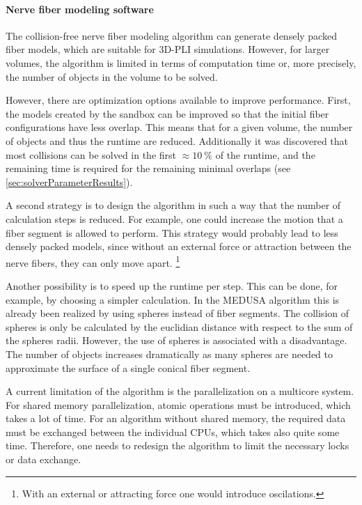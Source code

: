 \paragraph{Nerve fiber modeling software}
% 
The collision-free nerve fiber modeling algorithm can generate densely packed fiber models, which are suitable for \ac{3D-PLI} simulations.
However, for larger volumes, the algorithm is limited in terms of computation time or, more precisely, the number of objects in the volume to be solved.
\par
% 
However, there are optimization options available to improve performance.
First, the models created by the sandbox can be improved so that the initial fiber configurations have less overlap. 
This means that for a given volume, the number of objects and thus the runtime are reduced. 
Additionally it was discovered that most collisions can be solved in the first $\approx \SI{10}{\percent}$ of the runtime, and the remaining time is required for the remaining minimal overlaps (see \cref{sec:solverParameterResults}).
\par
% 
A second strategy is to design the algorithm in such a way that the number of calculation steps is reduced.
For example, one could increase the motion that a fiber segment is allowed to perform.
This strategy would probably lead to less densely packed models, since without an external force or attraction between the nerve fibers, they can only move apart. \footnote{With an external or attracting force one would introduce oscilations.}
% 
\par
Another possibility is to speed up the runtime per step.
This can be done, for example, by choosing a simpler calculation.
In the \ac{MEDUSA} algorithm this is already been realized by using spheres instead of fiber segments.
The collision of spheres is only be calculated by the euclidian distance with respect to the sum of the spheres radii.
However, the use of spheres is associated with a disadvantage.
The number of objects increases dramatically as many spheres are needed to approximate the surface of a single conical fiber segment.
\par
% 
A current limitation of the algorithm is the parallelization on a multicore system.
For shared memory parallelization, atomic operations must be introduced, which takes a lot of time.
For an algorithm without shared memory, the required data must be exchanged between the individual CPUs, which takes also quite some time. 
Therefore, one needs to redesign the algorithm to limit the necessary locks or data exchange.
